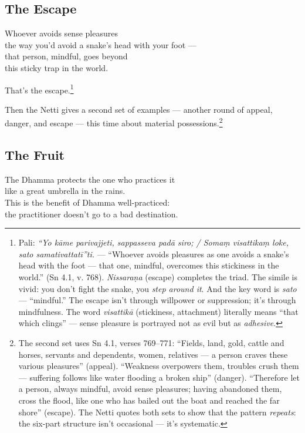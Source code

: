 \subsection*{The Escape}

\begin{versebox}
Whoever avoids sense pleasures\\
the way you'd avoid a snake's head with your foot ---\\
that person, mindful, goes beyond\\
this sticky trap in the world.
\end{versebox}

That's the escape.\footnote{Pali: \textit{``Yo kāme parivajjeti, sappasseva padā siro; / Somaṃ visattikaṃ loke, sato samativattatī''ti.} --- ``Whoever avoids pleasures as one avoids a snake's head with the foot --- that one, mindful, overcomes this stickiness in the world.'' (Sn 4.1, v. 768). \textit{Nissaraṇa} (escape) completes the triad. The simile is vivid: you don't fight the snake, you \textit{step around it}. And the key word is \textit{sato} --- ``mindful.'' The escape isn't through willpower or suppression; it's through mindfulness. The word \textit{visattikā} (stickiness, attachment) literally means ``that which clings'' --- sense pleasure is portrayed not as evil but as \textit{adhesive}.}

Then the Netti gives a second set of examples --- another round of appeal, danger, and escape --- this time about material possessions.\footnote{The second set uses Sn 4.1, verses 769--771: ``Fields, land, gold, cattle and horses, servants and dependents, women, relatives --- a person craves these various pleasures'' (appeal). ``Weakness overpowers them, troubles crush them --- suffering follows like water flooding a broken ship'' (danger). ``Therefore let a person, always mindful, avoid sense pleasures; having abandoned them, cross the flood, like one who has bailed out the boat and reached the far shore'' (escape). The Netti quotes both sets to show that the pattern \textit{repeats}: the six-part structure isn't occasional --- it's systematic.}

\subsection*{The Fruit}

\begin{versebox}
The Dhamma protects the one who practices it\\
like a great umbrella in the rains.\\
This is the benefit of Dhamma well-practiced:\\
the practitioner doesn't go to a bad destination.
\end{versebox}

